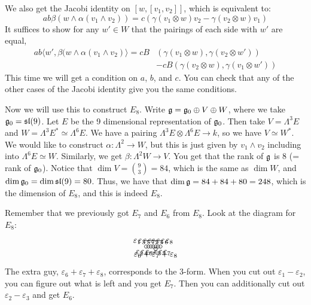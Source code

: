  We also get the Jacobi identity on $[w,[v_1,v_2]]$, which is equivalent to:
 \[ ab\beta (w\wedge \alpha(v_1\wedge v_2)) = c(\gamma(v_1\otimes w)v_2-\gamma(v_2\otimes w)v_1)
 \]
 It suffices to show for any $w'\in W$ that the pairings of each side with $w'$ are equal,
 \begin{align*}
   ab\langle w',\beta(w\wedge \alpha(v_1\wedge v_2)\rangle = c B&(\gamma(v_1\otimes
   w),\gamma(v_2\otimes w')) \\ &- c B(\gamma(v_2\otimes w),\gamma(v_1\otimes w'))
 \end{align*}
 This time we will get a condition on $a$, $b$, and $c$.
 You can check that any of the other cases of the Jacobi identity give you the same conditions.

 Now we will use this to construct $E_8$. Write $\mathfrak{g} = \mathfrak{g}_0\oplus V\oplus W$, where we
 take $\mathfrak{g}_0=\mathfrak{sl}(9)$. Let $E$ be the 9 dimensional representation of $\mathfrak{g}_0$. Then take
 $V=\Lambda^3 E$ and $W=\Lambda^3 E^* \simeq \Lambda^6 E$. We have a pairing
 $\Lambda^3 E \otimes \Lambda^6 E\to k$, so we have $V\simeq W^*$. We would like to
 construct $\alpha: \Lambda^2 \to W$, but this is just given by $v_1\wedge v_2$
 including into $\Lambda^6 E\simeq W$. Similarly, we get $\beta:\Lambda^2 W\to V$. You
 get that the rank of $\mathfrak{g}$ is 8 (= rank of $\mathfrak{g}_0$). Notice that $\dim V =
 \binom{9}{3} = 84$, which is the same as $\dim W$, and $\dim \mathfrak{g} _0 = \dim \mathfrak{sl}(9)=80$.
Thus, we have that $\dim \mathfrak{g} = 84 + 84+80=248$, which is the dimension of $E_8$, and
this is indeed $E_8$.

 Remember that we previously got $E_7$ and $E_6$ from $E_8$. Look at the diagram for $E_8$:
 \[ \begin{xy}
   (0,0) *+!D{\varepsilon_1-\varepsilon_2} *\cir<2pt>{};
   (1,0) *+!U{\varepsilon_2-\varepsilon_3} *\cir<2pt>{} **@{-};
   p+(1,0) *+!D{\varepsilon_3-\varepsilon_4} *\cir<2pt>{} **@{-};
   p+(1,0) *+!U{\varepsilon_4-\varepsilon_5} *\cir<2pt>{} **@{-};
   p+(1,0) *+!D{\varepsilon_5-\varepsilon_6} *\cir<2pt>{} **@{-};
   p+(0,-1) *+!U{\varepsilon_6+\varepsilon_7+\varepsilon_8} *\cir<2pt>{} **@{-},
   p+(1,0) *+!U{\varepsilon_6-\varepsilon_7} *\cir<2pt>{} **@{-};
   p+(1,0) *+!D{\varepsilon_7-\varepsilon_8} *\cir<2pt>{} **@{-};
 \end{xy}\]
 The extra guy, $\varepsilon_6+\varepsilon_7+\varepsilon_8$, corresponds to the 3-form. When you cut out
 $\varepsilon_1-\varepsilon_2$, you can figure out what is left and you get $E_7$.
 Then you can additionally cut out $\varepsilon_2-\varepsilon_3$ and get $E_6$.

